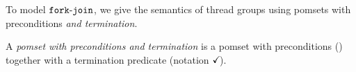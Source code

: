 To model $\FORKJOIN{}$, we give the semantics of thread groups using pomsets
with preconditions \emph{and termination}.
\begin{definition}
  \label{def:pomsets-term}
  A \emph{pomset with preconditions and termination} is a pomset with
  preconditions () together with a termination
  predicate (notation $\checkmark\!$).
\end{definition}







